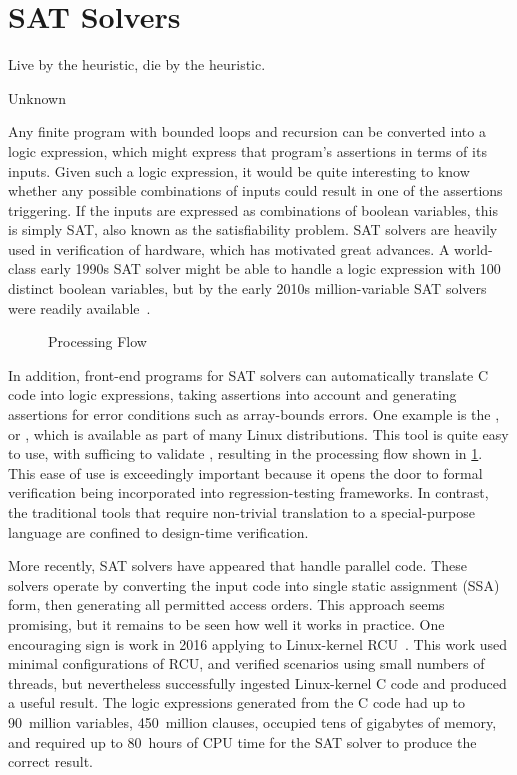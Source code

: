 
\section{SAT Solvers}
\label{sec:formal:SAT Solvers}
%
\epigraph{Live by the heuristic, die by the heuristic.}{Unknown}

Any finite program with bounded loops and recursion can be converted
into a logic expression, which might express that program's assertions
in terms of its inputs.
Given such a logic expression, it would be quite interesting to know
whether any possible combinations of inputs could result in one of
the assertions triggering.
If the inputs are expressed as combinations of boolean variables,
this is simply SAT, also known as the satisfiability problem.
SAT solvers are heavily used in verification of hardware, which has
motivated great advances.
A world-class early 1990s SAT solver might be able to handle a logic
expression with 100 distinct boolean variables, but by the early 2010s
million-variable SAT solvers were readily
available~\cite{Kroening:2008:DPA:1391237}.

\begin{figure}
\centering
{}
\caption{ Processing Flow}
\label{fig:formal:CBMC Processing Flow}
\end{figure}

In addition, front-end programs for SAT solvers can automatically translate
C code into logic expressions, taking assertions into account and generating
assertions for error conditions such as array-bounds errors.
One example is the , or , which is
available as part of many Linux distributions.
This tool is quite easy to use, with  sufficing to
validate , resulting in the processing flow shown in
\cref{fig:formal:CBMC Processing Flow}.
This ease of use is exceedingly important because it opens the door
to formal verification being incorporated into regression-testing
frameworks.
In contrast, the traditional tools that require non-trivial translation
to a special-purpose language are confined to design-time verification.

More recently, SAT solvers have appeared that handle parallel code.
These solvers operate by converting the input code into single static
assignment (SSA) form, then generating all permitted access orders.
This approach seems promising, but it remains to be seen how well
it works in practice.
One encouraging sign is work in 2016 applying  to Linux-kernel
RCU~\cite{LihaoLiang2016VerifyTreeRCU,Liang:2018:VTB,LanceRoy2017CBMC-SRCU}.
This work used minimal configurations of RCU, and verified scenarios
using small numbers of threads, but nevertheless successfully ingested
Linux-kernel C code and produced a useful result.
The logic expressions generated from the C code had up to 90~million
variables, 450~million clauses, occupied tens of gigabytes of memory,
and required up to 80~hours of CPU time for the SAT solver to produce
the correct result.


